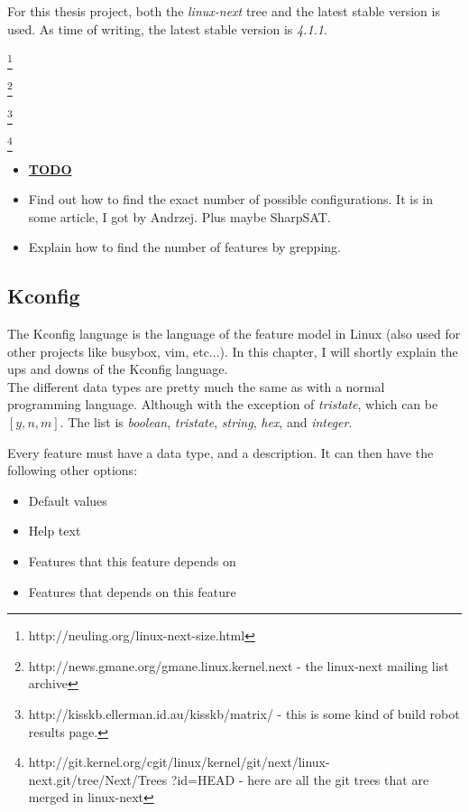 \documentclass[a4paper,11pt]{article}
\begin{document}
For this thesis project, both the \emph{linux-next} tree and the latest stable 
version is used. As time of writing, the latest stable version is \emph{4.1.1}.

\footnote{http://neuling.org/linux-next-size.html}

\footnote{http://news.gmane.org/gmane.linux.kernel.next - the linux-next 
mailing list archive}

\footnote{http://kisskb.ellerman.id.au/kisskb/matrix/ - this is some kind of 
build robot results page.}

\footnote{
http://git.kernel.org/cgit/linux/kernel/git/next/linux-next.git/tree/Next/Trees
?id=HEAD - here are all the git trees that are merged in linux-next}


\begin{itemize}
    \item \underline{\textbf{TODO}}
    \item Find out how to find the exact number of possible configurations. It 
        is in some article, I got by Andrzej. Plus maybe SharpSAT.
    \item Explain how to find the number of features by grepping.
\end{itemize}


\subsection{Kconfig}

The Kconfig language is the language of the feature model in Linux (also used for 
other projects like busybox, vim, etc...). In this chapter, I will shortly 
explain the ups and downs of the Kconfig language. \\


The different data types are pretty much the same as with a normal programming 
language. Although with the exception of \emph{tristate}, which can be $[y, n, 
m]$. The list is \emph{boolean}, \emph{tristate}, \emph{string}, \emph{hex}, 
and \emph{integer}.

Every feature must have a data type, and a description. It can then have the 
following other options:

\begin{itemize}
    \item Default values
    \item Help text
    \item Features that this feature depends on
    \item Features that depends on this feature
\end{itemize}
\end{document}

